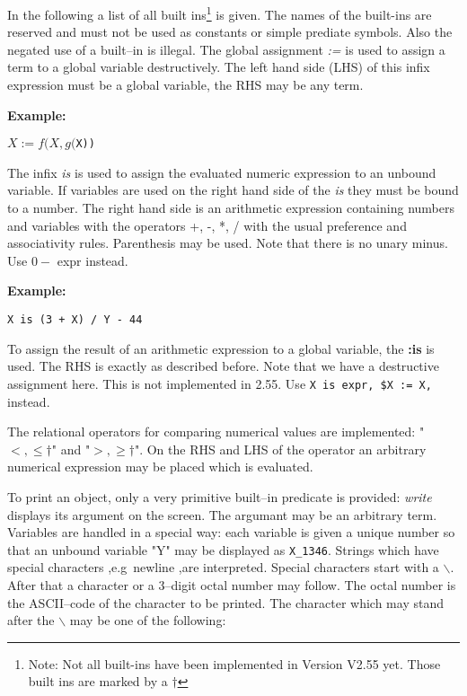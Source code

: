 In the following a list of all built ins{\footnote{
Note: Not all built-ins have been implemented in Version V2.55 yet.
Those built ins are marked by a $\dag$}} is given. The names
of the built-ins are reserved and must not be used as constants
or simple prediate symbols. Also the negated use of a built--in
is illegal.
The global assignment {\it :=\/} is used to assign a term to
a global variable destructively. The left hand side (LHS) of this infix
expression must be a global variable, the RHS may be any term.

{\bf Example:}
\begin{center}
{\tt $X := f(X,g($X))}
\end{center}


The infix {\it is\/} is used to assign the evaluated numeric expression
to an unbound variable. If variables are used on the right
hand side of the {\it is\/} they must be bound to a number.
The right hand side is an arithmetic expression containing numbers
and variables with the operators +, -, *, / with the usual preference
and associativity rules. Parenthesis may be used.
Note that there is no unary minus. Use $0 -$ expr instead.

{\bf Example:}
\begin{center}
{\tt X is (3 + X) / Y - 44}
\end{center}

To assign the result of an arithmetic expression to a global variable,
the {\bf :is} is used. The RHS is exactly as described before.
Note that we have a destructive assignment here.
This is not implemented in 2.55. Use
{\tt X is expr, \$X := X, }
instead.

The relational operators for comparing numerical values are
implemented: "$<, \leq\dag$" and "$>, \geq\dag$".
On the RHS and LHS of the operator
an arbitrary numerical expression may be placed which is
evaluated.

To print an object, only a very primitive built--in predicate is 
provided: {\it write\/} displays its argument on the screen.
The argumant may be an arbitrary term. Variables are handled in
a special way: each variable is given a unique number so that
an unbound variable "Y" may be displayed as {\tt X\_1346}.
Strings which have special characters ,e.g\ newline ,are interpreted.
Special characters start with a $\backslash$.
After that a character or a 3--digit octal number may follow.
The octal number is the ASCII--code of the character to
be printed.
The character which may stand after the $\backslash$ may be one of the following:

